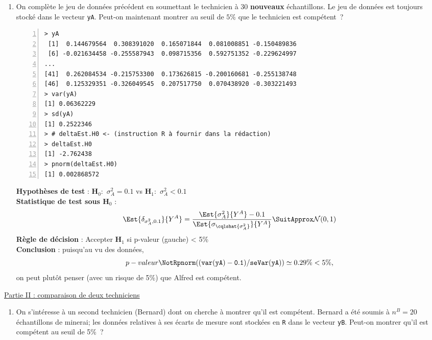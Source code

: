 \documentclass[10pt]{report}
\begin{document}
\begin{exercice}
\begin{enumerate}
\item On complète le jeu de données précédent en soumettant le technicien à 30 \textbf{nouveaux} échantillons. Le jeu de données est toujours stocké dans le vecteur \texttt{yA}. Peut-on maintenant montrer au seuil de $5\%$ que le technicien est compétent~?

\IndicR
\begin{Verbatim}[frame=leftline,fontfamily=tt,fontshape=n,numbers=left]
> yA
 [1]  0.144679564  0.308391020  0.165071844  0.081008851 -0.150489836
 [6] -0.021634458 -0.255587943  0.098715356  0.592751352 -0.229624997
...
[41]  0.262084534 -0.215753300  0.173626815 -0.200160681 -0.255138748
[46]  0.125329351 -0.326049545  0.207517750  0.070438920 -0.303221493
> var(yA)
[1] 0.06362229
> sd(yA)
[1] 0.2522346
> # deltaEst.H0 <- (instruction R à fournir dans la rédaction)
> deltaEst.H0
[1] -2.762438
> pnorm(deltaEst.H0)
[1] 0.002868572
\end{Verbatim}



\begin{Correction}

\noindent \textbf{Hypothèses de test} : $\mathbf{H}_0:$ $\sigma^2_{A}=0.1$ vs {\large $\mathbf{H}_1:$ $\sigma^2_{A}<0.1$}\\
\textbf{Statistique de test sous $\mathbf{H}_0$} :
  $$
  \Est{\delta_{\sigma^2_{A},0.1}}{Y^{A}}= {\displaystyle \frac{\Est{\sigma^2_{A}}{Y^{A}}-0.1}{
\Est{\sigma_{\cqlshat{\sigma^2_{A}}}}{Y^{A}}
}} 
  \SuitApprox \mathcal{N}(0,1)
  $$
\textbf{Règle de décision} : Accepter $\mathbf{H}_1$ si 
  p-valeur (gauche) < 5\%\\
\noindent \textbf{Conclusion} :
puisqu'au vu des données, 
  \[
p-valeur\NotR\mathtt{pnorm((var(yA)-0.1)/seVar(yA))} \simeq 0.29\% < 5\%,
\]
on peut plutôt penser (avec un risque de 5\%) que Alfred est compétent.
\end{Correction}

\end{enumerate}

\noindent \underline{Partie II : comparaison de deux techniciens} \\

\begin{enumerate}

\item On s'intéresse à un second technicien (Bernard) dont on cherche à montrer qu'il est compétent. Bernard a été soumis à $n^B=20$ échantillons de minerai; les données relatives à ses écarts de mesure sont stockées en \texttt{R} dans le vecteur \texttt{yB}. Peut-on montrer qu'il est compétent au seuil de 5\%~?



\end{enumerate}
\end{exercice}
\end{document}

